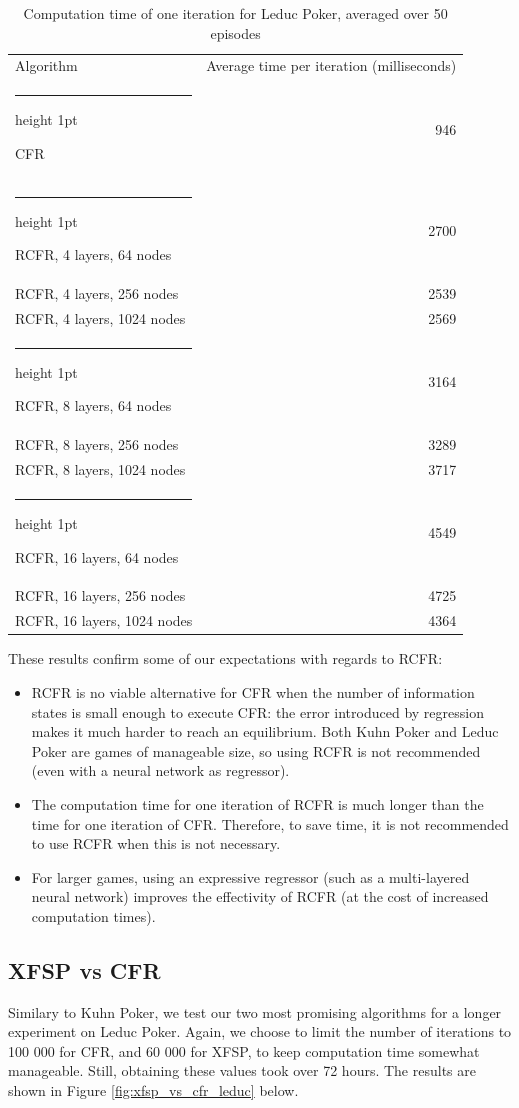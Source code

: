 \documentclass[10pt,a4paper]{article}
\makeatletter
\newcommand{\thickhline}{%
    \noalign {\ifnum 0=`}\fi \hrule height 1pt
    \futurelet \reserved@a \@xhline
}
\makeatother
\begin{document}
\FloatBarrier
\begin{table}
	\centering
	\begin{tabular}{|l|r|}
	\hline
	Algorithm & Average time per iteration (milliseconds)\\
	\thickhline
	CFR & 946 \\
	\thickhline
	RCFR, 4 layers, 64 nodes& 2700 \\
	\hline
	RCFR, 4 layers, 256 nodes & 2539 \\
	\hline
	RCFR, 4 layers, 1024 nodes & 2569 \\
	\thickhline
	RCFR, 8 layers, 64 nodes & 3164 \\
	\hline
	RCFR, 8 layers, 256 nodes  & 3289 \\
	\hline
	RCFR, 8 layers, 1024 nodes  & 3717 \\
	\thickhline
	RCFR, 16 layers, 64 nodes & 4549 \\
	\hline
	RCFR, 16 layers, 256 nodes & 4725 \\
	\hline
	RCFR, 16 layers, 1024 nodes & 4364 \\
	\hline
	\end{tabular}
	\caption{Computation time of one iteration for Leduc Poker, averaged over 50 episodes}
	\label{tbl:leduc_times}
\end{table}
\FloatBarrier

These results confirm some of our expectations with regards to RCFR:
\begin{itemize}
\item{RCFR is no viable alternative for CFR when the number of information states is small enough to execute CFR: the error introduced by regression makes it much harder to reach an equilibrium. Both Kuhn Poker and Leduc Poker are games of manageable size, so using RCFR is not recommended (even with a neural network as regressor).}
\item{The computation time for one iteration of RCFR is much longer than the time for one iteration of CFR. Therefore, to save time, it is not recommended to use RCFR when this is not necessary.}
\item{For larger games, using an expressive regressor (such as a multi-layered neural network) improves the effectivity of RCFR (at the cost of increased computation times).}
\end{itemize}

\subsection{XFSP vs CFR}
Similary to Kuhn Poker, we test our two most promising algorithms for a longer experiment on Leduc Poker. Again, we choose to limit the number of iterations to 100 000 for CFR, and 60 000 for XFSP, to keep computation time somewhat manageable. Still, obtaining these values took over 72 hours. The results are shown in Figure \ref{fig:xfsp_vs_cfr_leduc} below.
\end{document}
